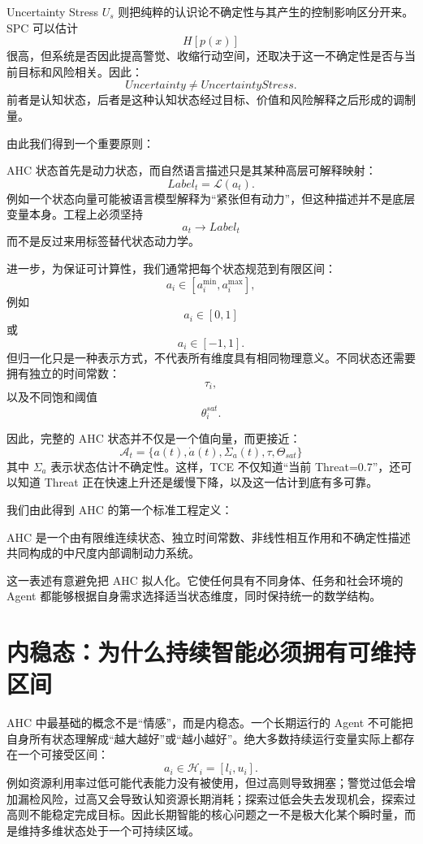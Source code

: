 Uncertainty Stress \(U_s\) 则把纯粹的认识论不确定性与其产生的控制影响区分开来。SPC 可以估计
\[
H[p(x)]
\]
很高，但系统是否因此提高警觉、收缩行动空间，还取决于这一不确定性是否与当前目标和风险相关。因此：
\[
Uncertainty
\neq
UncertaintyStress.
\]
前者是认知状态，后者是这种认知状态经过目标、价值和风险解释之后形成的调制量。

由此我们得到一个重要原则：
\begin{statementbox}
\centering
{}
\end{statementbox}
AHC 状态首先是动力状态，而自然语言描述只是其某种高层可解释映射：
\[
Label_t
=
\mathcal L(a_t).
\]
例如一个状态向量可能被语言模型解释为“紧张但有动力”，但这种描述并不是底层变量本身。工程上必须坚持
\[
a_t \rightarrow Label_t
\]
而不是反过来用标签替代状态动力学。

进一步，为保证可计算性，我们通常把每个状态规范到有限区间：
\[
a_i\in[a_i^{\min},a_i^{\max}],
\]
例如
\[
a_i\in[0,1]
\]
或
\[
a_i\in[-1,1].
\]
但归一化只是一种表示方式，不代表所有维度具有相同物理意义。不同状态还需要拥有独立的时间常数：
\[
\tau_i,
\]
以及不同饱和阈值
\[
\theta_i^{sat}.
\]

因此，完整的 AHC 状态并不仅是一个值向量，而更接近：
\[
\boxed{
\mathcal A_t
=
\{
a(t),
\dot a(t),
\Sigma_a(t),
\tau,
\Theta_{sat}
\}
}
\]
其中 \(\Sigma_a\) 表示状态估计不确定性。这样，TCE 不仅知道“当前 Threat=0.7”，还可以知道 Threat 正在快速上升还是缓慢下降，以及这一估计到底有多可靠。

我们由此得到 AHC 的第一个标准工程定义：

\begin{definition*}
AHC 是一个由有限维连续状态、独立时间常数、非线性相互作用和不确定性描述共同构成的中尺度内部调制动力系统。
\end{definition*}

这一表述有意避免把 AHC 拟人化。它使任何具有不同身体、任务和社会环境的 Agent 都能够根据自身需求选择适当状态维度，同时保持统一的数学结构。

\section{内稳态：为什么持续智能必须拥有可维持区间}

AHC 中最基础的概念不是“情感”，而是内稳态。一个长期运行的 Agent 不可能把自身所有状态理解成“越大越好”或“越小越好”。绝大多数持续运行变量实际上都存在一个可接受区间：
\[
a_i
\in
\mathcal H_i
=
[l_i,u_i].
\]
例如资源利用率过低可能代表能力没有被使用，但过高则导致拥塞；警觉过低会增加漏检风险，过高又会导致认知资源长期消耗；探索过低会失去发现机会，探索过高则不能稳定完成目标。因此长期智能的核心问题之一不是极大化某个瞬时量，而是维持多维状态处于一个可持续区域。

